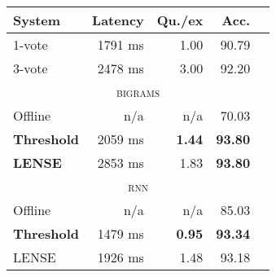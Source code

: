 \begin{tabular}[b]{l  r  r  r  r}
    \textbf{System} & \textbf{Latency} & \textbf{Qu./ex} & \textbf{Acc.} \\ \hline
    1-vote & 1791 ms & 1.00 & 90.79 \\ %
    3-vote & 2478 ms & 3.00 & 92.20 \\ %
    \multicolumn{5}{c}{\textsc{bigrams}} \\ \hline
    Offline & n/a & n/a & 70.03 \\ %
    \textbf{Threshold} & 2059 ms & \textbf{1.44} & \textbf{93.80} \\ %
    \textbf{LENSE} & 2853 ms & 1.83 & \textbf{93.80} \\%
    \multicolumn{5}{c}{\textsc{rnn}} \\ \hline
    Offline & n/a & n/a & 85.03 \\ %
    \textbf{Threshold} & 1479 ms & \textbf{0.95} & \textbf{93.34} \\ %
    LENSE & 1926 ms & 1.48 & 93.18 \\ %
\end{tabular}
